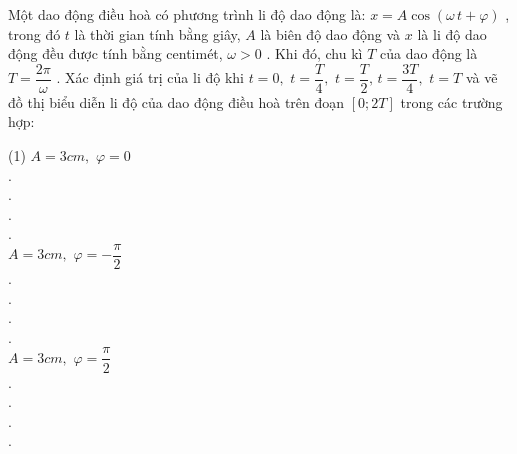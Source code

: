 \begin{vd} Một dao động điều hoà có phương trình li độ dao động là: $x=A\cos\left(\omega\,t+\varphi\right)$ , trong đó $t$ là thời gian tính bằng giây, $A$ là biên độ dao động và $x$ là li độ dao động đều được tính bằng centimét, $\omega >0$ . Khi đó, chu kì $T$ của dao động là $T=\dfrac{2\pi}{\omega}$ . Xác định giá trị của li độ khi $t=0,\,\,t=\dfrac{T}{4},\,\,t=\dfrac{T}{2},\,t=\dfrac{3T}{4},\,\,t=T$ và vẽ đồ thị biểu diễn li độ của dao động điều hoà trên đoạn $\left[0;2T\right]$ trong các trường hợp:
	\begin{tasks}(1)
		\task $A=3cm,\,\,\varphi=0$\dotfill\\
		.\dotfill\\
		.\dotfill\\
		.\dotfill\\
		.\dotfill\\
		\task $A=3cm,\,\,\varphi=-\dfrac{\pi}{2}$\dotfill\\
		.\dotfill\\
		.\dotfill\\
		.\dotfill\\
		.\dotfill\\
		\task $A=3cm,\,\,\varphi=\dfrac{\pi}{2}$\dotfill\\
		.\dotfill\\
		.\dotfill\\
		.\dotfill\\
		.\dotfill\\
	\end{tasks}
\end{vd}
